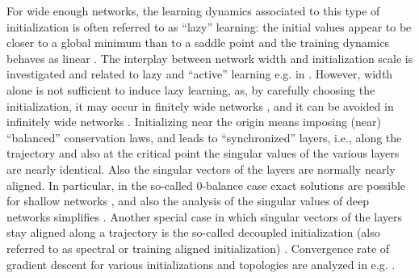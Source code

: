 \documentclass{article}
\newcommand{\1}{\mathds{1}}
\begin{document}
For wide enough networks, the learning dynamics associated to this type of initialization is often referred to as ``lazy'' learning: the initial values appear to be closer to a global minimum than to a saddle point and the training dynamics behaves as linear \cite{jacot2021saddle}.
The interplay between network width and initialization scale is investigated and related to lazy and ``active'' learning e.g. in \cite{tu2024mixed}. However, width alone is not sufficient to induce lazy learning, as, by carefully choosing the  initialization, it may occur in finitely wide networks \cite{kunin2024get}, and it can be avoided in infinitely wide networks \cite{chizat2024infinite}.
Initializing near the origin means imposing (near) ``balanced'' conservation laws, and leads to ``synchronized'' layers, i.e., along the trajectory and also at the critical point the singular values of the various layers are nearly identical. Also the singular vectors of the layers are normally nearly aligned.
In particular, in the so-called 0-balance case exact solutions are possible for shallow networks \cite{saxe2013exact,domine2023exact}, and also the analysis of the singular values of deep networks simplifies \cite{arora2019implicit}.
Another special case in which singular vectors of the layers stay aligned along a trajectory is the so-called decoupled initialization (also referred to as spectral or training aligned initialization) \cite{saxe2019mathematical,tarmoun2021understanding,gidel2019implicit,min2023convergence,lampinen2018analytic}.
Convergence rate of gradient descent for various initializations and topologies are analyzed in e.g. \cite{arora2018convergence,chitour2018geometric,tarmoun2021understanding,min2023convergence}.
\end{document}
